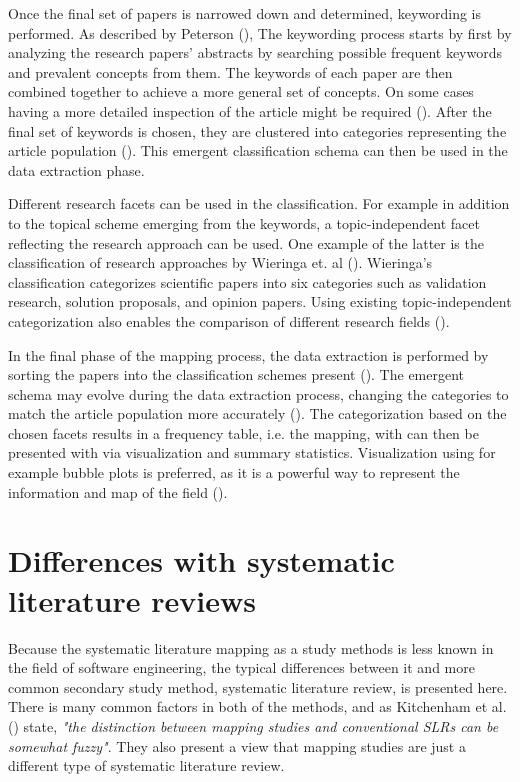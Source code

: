 \documentclass[utf8,english]{gradu3}
\begin{document}
Once the final set of papers is narrowed down and determined, keywording is
performed. As described by Peterson (\cite*{petersen2008}), The keywording
process starts by first by analyzing the research papers' abstracts by searching
possible frequent keywords and prevalent concepts from them. The keywords of
each paper are then combined together to achieve a more general set of concepts.
On some cases having a more detailed inspection of the article might be required
(\cite{petersen2008,petersen2015}). After the final set of keywords is chosen,
they are clustered into categories representing the article population
(\cite{petersen2008}). This emergent classification schema can then be used in
the data extraction phase.

Different research facets can be used in the classification. For example in
addition to the topical scheme emerging from the keywords, a topic-independent
facet reflecting the research approach can be used. One example of the latter is
the classification of research approaches by Wieringa et. al
(\cite*{wieringa2006}). Wieringa's classification categorizes scientific papers
into six categories such as validation research, solution proposals, and opinion
papers. Using existing topic-independent categorization also enables the
comparison of  different research fields (\cite{petersen2015}).

In the final phase of the mapping process, the data extraction is performed by
sorting the papers into the classification schemes present
(\cite{petersen2008}). The emergent schema may evolve during the data extraction
process, changing the categories to match the article population more accurately
(\cite{petersen2015}). The categorization based on the chosen facets results in
a frequency table, i.e. the mapping, with can then be presented with via
visualization and summary statistics. Visualization using for example bubble
plots is preferred, as it is a powerful way to represent the information and map
of the field (\cite{petersen2008}).


\section{Differences with systematic literature reviews}

Because the systematic literature mapping as a study methods is less known in
the field of software engineering, the typical differences between it and more
common secondary study method, systematic literature review, is presented here.
There is many common factors in both of the methods, and as Kitchenham et al.
(\cite*{kitchenham2010}) state, \textit{"the distinction between mapping studies
and conventional SLRs can be somewhat fuzzy"}. They also present a view that
mapping studies are just a different type of systematic literature review.
\end{document}
